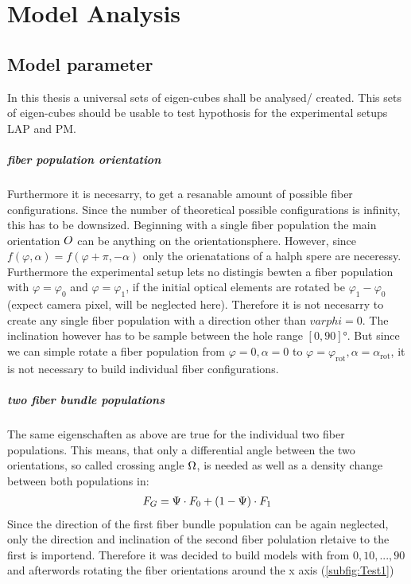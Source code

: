 \setcounter{chapter}{6}
\chapter{Model Analysis}
\label{cha:model_analysis}
% 
\section{Model parameter}
% 
In this thesis a universal sets of eigen-cubes shall be analysed/ created.
This sets of eigen-cubes should be usable to test hypothosis for the experimental setups \ac{LAP} and \ac{PM}.
\paragraph{fiber population orientation}
Furthermore it is necesarry, to get a resanable amount of possible fiber configurations.
Since the number of theoretical possible configurations is infinity, this has to be downsized.
Beginning with a single fiber population the main orientation $\textnormal{$O$}$ can be anything on the orientationsphere.
However, since $f(\varphi,\alpha) = f(\varphi+\pi,-\alpha)$ only the orienatations of a halph spere are neceressy.
Furthermore the experimental setup lets no distingis bewten a fiber population with $\varphi = \varphi_0$ and $\varphi = \varphi_1$, if the initial optical elements are rotated be $\varphi_1-\varphi_0$ (expect camera pixel, will be neglected here).
Therefore it is not necesarry to create any single fiber population with a direction other than $varphi = 0$.
The inclination however has to be sample between the hole range $[0,90]\si{\degree}$. But since we can simple rotate a fiber population from $\varphi=0, \alpha=0$ to $\varphi=\varphi_{\text{rot}}, \alpha=\alpha_{\text{rot}}$, it is not necessary to build individual fiber configurations.
% 
\paragraph{two fiber bundle populations}
The same eigenschaften as above are true for the individual two fiber populations. This means, that only a differential angle between the two orientations, so called crossing angle $\textnormal{$\Omega$}$, is needed as well as a density change between both populations \modelPsi in:
\begin{align}
    F_G = \textnormal{$\Psi$} \cdot F_0 + (1-\textnormal{$\Psi$}) \cdot F_1
\end{align}
% 
Since the direction of the first fiber bundle population can be again neglected, only the direction and inclination of the second fiber polulation rletaive to the first is importend. Therefore it was decided to build models with \modelOmega from ${0,10,...,90}$ and afterwords rotating the fiber orientations around the x axis (\cref{subfig:Test1})
% 
